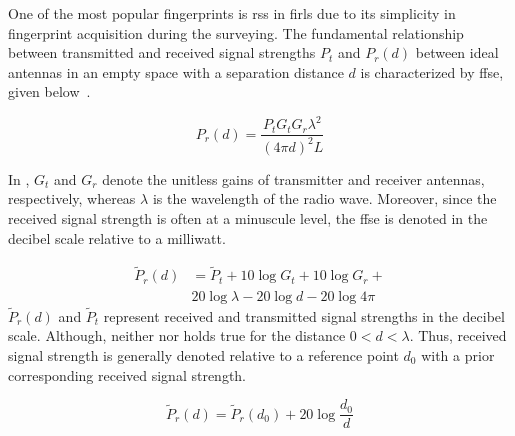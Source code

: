     One of the most popular fingerprints is \gls{rss} in \gls{firl}s due to its simplicity in fingerprint acquisition during the surveying.
    The fundamental relationship between transmitted and received signal strengths $P_t$ and $P_r(d)$ between ideal antennas in an empty space with a separation distance $d$ is characterized by \gls{ffse}, given below~\cite{friis1946note}.

    \begin{equation}
        \label{eq:friisWatts}
            P_r(d) = \dfrac{P_t  G_t  G_r \lambda^2}{{\left(4 \pi d\right)}^2 L}
    \end{equation}

    In , $G_t$ and $G_r$ denote the unitless gains of transmitter and receiver antennas, respectively, whereas $\lambda$ is the wavelength of the radio wave.
    Moreover, since the received signal strength is often at a minuscule level, the \gls{ffse} is denoted in the decibel scale relative to a milliwatt.

    \begin{equation}
      \begin{split}
        \label{eq:friisdBm}
        \widetilde{P}_r(d) &= \widetilde{P}_t + 10 \log{G_t} + 10 \log{G_r} + \\
        & 20 \log{\lambda} - 20 \log{d} - 20 \log{4 \pi}
      \end{split}
    \end{equation}
    $\widetilde{P}_r(d)$ and $\widetilde{P}_t$ represent received and transmitted signal strengths in the decibel scale.
    Although, neither  nor  holds true for the distance $0<d<\lambda$.
    Thus, received signal strength is generally denoted relative to a reference point $d_0$ with a prior corresponding received signal strength.

    \begin{equation}
        \label{eq:friisRef}
        \widetilde{P}_r(d) = \widetilde{P}_r(d_0) + 20 \log{\dfrac{d_0}{d}}
    \end{equation}


